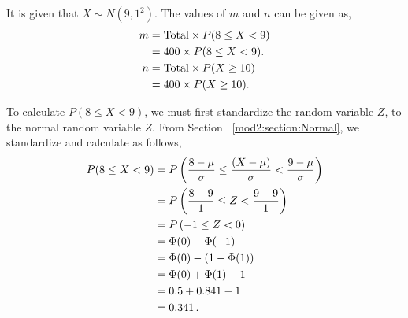 \begin{subquestions}
\subquestion

\begin{subsubquestions}
	
\subsubquestion

It is given that $X \sim N(9,1^2)$. The values of $m$ and $n$ can be given as,
\begin{align}
	m & = \text{Total} \times P(8 \leq X < 9) \nonumber \\
	  & = 400 \times P(8 \leq X < 9). \nonumber \\
    n & = \text{Total} \times P(X \geq 10) \nonumber \\
      & = 400 \times P(X \geq 10). 
\end{align}
	
To calculate $P(8 \leq X < 9)$, we must first standardize the random variable $Z$, to the normal random variable $Z$. From Section ~\ref{mod2:section:Normal}, we standardize and calculate as follows,
\begin{align}
	P(8 \leq X < 9) & = P\left(\frac{8- \mu}{\sigma} \leq \frac{(X-\mu)}{\sigma} < \frac{9-\mu}{\sigma} \right) \nonumber \\
	                & = P\left(\frac{8- 9}{1} \leq Z < \frac{9-9}{1} \right) \nonumber \\
	                & = P\left(-1 \leq Z < 0 \right) \nonumber \\
	                & = \Phi(0) - \Phi(-1) \nonumber \\
	                & = \Phi(0) - (1 - \Phi(1)) \nonumber \\
	                & = \Phi(0) + \Phi(1) - 1 \nonumber \\
	                & = 0.5 + 0.841 - 1 \nonumber \\
	                & = 0.341 \,.
\end{align}
	

\end{subsubquestions}

\end{subquestions}

